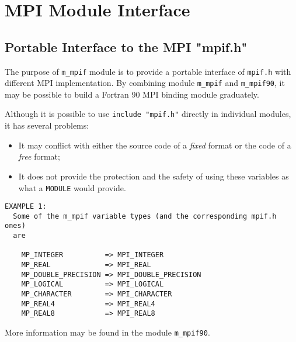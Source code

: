 %
 \section{MPI Module Interface}
%
\subsection{Portable Interface to the MPI "mpif.h"}
%
The purpose of \verb"m_mpif" module is to provide a portable
interface of \verb"mpif.h" with different MPI implementation.
By combining module \verb"m_mpif" and \verb"m_mpif90", it may be
possible to build a Fortran 90 MPI binding module graduately.

Although it is possible to use \verb'include "mpif.h"' directly
in individual modules, it has several problems:
\begin{itemize}
\item It may conflict with either the source code of a {\sl fixed}
      format or the code of a {\sl free} format;
\item It does not provide the protection and the safety of using
      these variables as what a \verb"MODULE" would provide.
\end{itemize}

\begin{verbatim}
EXAMPLE 1:
  Some of the m_mpif variable types (and the corresponding mpif.h ones)
  are

    MP_INTEGER          => MPI_INTEGER
    MP_REAL             => MPI_REAL
    MP_DOUBLE_PRECISION => MPI_DOUBLE_PRECISION
    MP_LOGICAL          => MPI_LOGICAL
    MP_CHARACTER        => MPI_CHARACTER
    MP_REAL4            => MPI_REAL4
    MP_REAL8            => MPI_REAL8
\end{verbatim}

More information may be found in the module \verb"m_mpif90".

